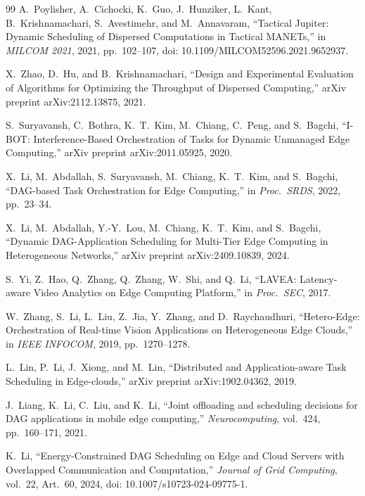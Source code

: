 \documentclass[conference]{IEEEtran}
\begin{document}
\begin{thebibliography}{99}
A.~Poylisher, A.~Cichocki, K.~Guo, J.~Hunziker, L.~Kant,
B.~Krishnamachari, S.~Avestimehr, and M.~Annavaram,
``Tactical Jupiter: Dynamic Scheduling of Dispersed Computations in
Tactical MANETs,''
in \emph{MILCOM 2021}, 2021, pp.~102--107, doi: 10.1109/MILCOM52596.2021.9652937.

X.~Zhao, D.~Hu, and B.~Krishnamachari,
``Design and Experimental Evaluation of Algorithms for Optimizing the
Throughput of Dispersed Computing,''
arXiv preprint arXiv:2112.13875, 2021.

S.~Suryavansh, C.~Bothra, K.~T.~Kim, M.~Chiang, C.~Peng, and S.~Bagchi,
``{I-BOT}: Interference-Based Orchestration of Tasks for Dynamic Unmanaged
Edge Computing,''
arXiv preprint arXiv:2011.05925, 2020.

X.~Li, M.~Abdallah, S.~Suryavansh, M.~Chiang, K.~T.~Kim, and S.~Bagchi,
``DAG-based Task Orchestration for Edge Computing,''
in \emph{Proc.\ SRDS}, 2022, pp.~23--34.

X.~Li, M.~Abdallah, Y.-Y.~Lou, M.~Chiang, K.~T.~Kim, and S.~Bagchi,
``Dynamic {DAG}-Application Scheduling for Multi-Tier Edge Computing in
Heterogeneous Networks,''
arXiv preprint arXiv:2409.10839, 2024.

S.~Yi, Z.~Hao, Q.~Zhang, Q.~Zhang, W.~Shi, and Q.~Li,
``{LAVEA}: Latency-aware Video Analytics on Edge Computing Platform,''
in \emph{Proc.\ SEC}, 2017.

W.~Zhang, S.~Li, L.~Liu, Z.~Jia, Y.~Zhang, and D.~Raychaudhuri,
``Hetero-Edge: Orchestration of Real-time Vision Applications on
Heterogeneous Edge Clouds,''
in \emph{IEEE INFOCOM}, 2019, pp.~1270--1278.

L.~Lin, P.~Li, J.~Xiong, and M.~Lin,
``Distributed and Application-aware Task Scheduling in Edge-clouds,''
arXiv preprint arXiv:1902.04362, 2019.

J.~Liang, K.~Li, C.~Liu, and K.~Li,
``Joint offloading and scheduling decisions for {DAG} applications in
mobile edge computing,''
\emph{Neurocomputing},
vol.~424, pp.~160--171, 2021.

K.~Li,
``Energy-Constrained {DAG} Scheduling on Edge and Cloud Servers with
Overlapped Communication and Computation,''
\emph{Journal of Grid Computing}, vol.~22, Art.~60, 2024,
doi: 10.1007/s10723-024-09775-1.


\end{thebibliography}
\end{document}
